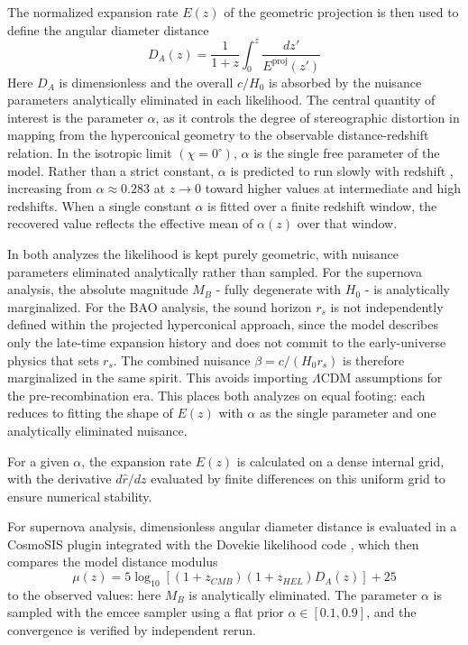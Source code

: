 \documentclass[preprint,12pt]{elsarticle}
\begin{document}
The normalized expansion rate $E(z)$ of the geometric projection is then used to define the angular diameter distance
\begin{equation}
    D_A(z) = \frac{1}{1 + z} \int_{0}^{z} \frac{dz'}{E^{\mathrm{proj}}(z')}
\end{equation}
Here $D_A$ is dimensionless and the overall $c/H_0$ is absorbed by the nuisance parameters analytically eliminated in each likelihood. The central quantity of interest is the parameter $\alpha$, as it controls the degree of stereographic distortion in mapping from the hyperconical geometry to the observable distance-redshift relation. In the isotropic limit $(\chi = 0^\circ)$, $\alpha$ is the single free parameter of the model. Rather than a strict constant, $\alpha$ is predicted to run slowly with redshift \cite{monjo2018projected}, increasing from $\alpha \approx 0.283$ at $z \rightarrow 0$ toward higher values at intermediate and high redshifts. When a single constant $\alpha$ is fitted over a finite redshift window, the recovered value reflects the effective mean of $\alpha(z)$ over that window.

In both analyzes the likelihood is kept purely geometric, with nuisance parameters eliminated analytically rather than sampled. For the supernova analysis, the absolute magnitude $M_B$ - fully degenerate with $H_0$ - is analytically marginalized. For the BAO analysis, the sound horizon $r_s$ is not independently defined within the projected hyperconical approach, since the model describes only the late-time expansion history and does not commit to the early-universe physics that sets $r_s$. The combined nuisance $\beta = c/(H_0r_s)$ is therefore marginalized in the same spirit. This avoids importing $\Lambda$CDM assumptions for the pre-recombination era. This places both analyzes on equal footing: each reduces to fitting the shape of $E(z)$ with $\alpha$ as the single parameter and one analytically eliminated nuisance.

For a given $\alpha$, the expansion rate $E(z)$ is calculated on a dense internal grid, with the derivative $d\hat{r}/dz$ evaluated by finite differences on this uniform grid to ensure numerical stability.

For supernova analysis, dimensionless angular diameter distance is evaluated in a CosmoSIS plugin integrated with the Dovekie likelihood code \cite{popovic2026dark}, which then compares the model distance modulus
\begin{equation}
    \mu(z) = 5\log_{10}[(1 + z_{CMB})(1 + z_{HEL})D_A(z)] + 25
\end{equation}
to the observed values: here $M_B$ is analytically eliminated. The parameter $\alpha$ is sampled with the emcee sampler using a flat prior $\alpha \in [0.1,0.9]$, and the convergence is verified by independent rerun.
\end{document}
